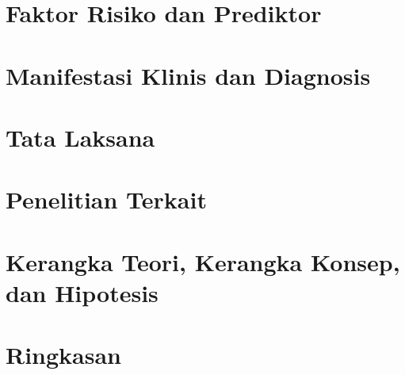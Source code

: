 \section{Faktor Risiko dan Prediktor}


\section{Manifestasi Klinis dan Diagnosis}


\section{Tata Laksana}


\section{Penelitian Terkait}


\section{Kerangka Teori, Kerangka Konsep, dan Hipotesis}


\section{Ringkasan}

